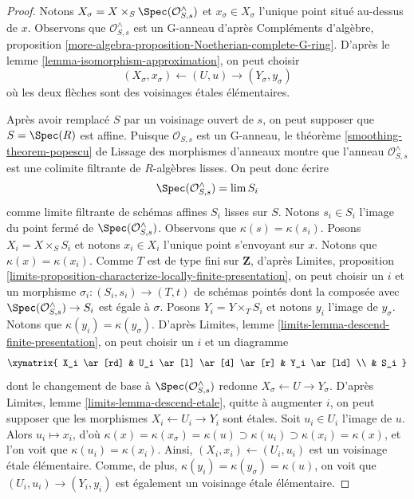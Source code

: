 \begin{proof}
Notons $X_\sigma = X \times_S \Spec(\mathcal{O}_{S, s}^\wedge)$
et $x_\sigma \in X_\sigma$ l'unique point situé au-dessus de $x$.
Observons que $\mathcal{O}_{S, s}^\wedge$ est un G-anneau d'après
Compléments d'algèbre, proposition
\ref{more-algebra-proposition-Noetherian-complete-G-ring}.
D'après le lemme \ref{lemma-isomorphism-approximation},
on peut choisir
$$
(X_\sigma, x_\sigma) \leftarrow (U, u) \rightarrow (Y_\sigma, y_\sigma)
$$
où les deux flèches sont des voisinages \'etales élémentaires.

\medskip\noindent
Après avoir remplacé $S$ par un voisinage ouvert de $s$, on peut
supposer que $S = \Spec(R)$ est affine. Puisque $\mathcal{O}_{S, s}$
est un G-anneau, le théorème \ref{smoothing-theorem-popescu} de Lissage des morphismes d'anneaux montre que
l'anneau $\mathcal{O}_{S, s}^\wedge$ est une colimite filtrante de
$R$-algèbres lisses. On peut donc écrire
$$
\Spec(\mathcal{O}_{S, s}^\wedge) = \lim S_i
$$
comme limite filtrante de schémas affines $S_i$ lisses sur $S$.
Notons $s_i \in S_i$ l'image du point fermé de
$\Spec(\mathcal{O}_{S, s}^\wedge)$. Observons que $\kappa(s) = \kappa(s_i)$.
Posons $X_i = X \times_S S_i$ et notons $x_i \in X_i$ l'unique
point s'envoyant sur $x$. Notons que $\kappa(x) = \kappa(x_i)$.
Comme $T$ est de type fini sur $\mathbf{Z}$, d'après Limites, proposition
\ref{limits-proposition-characterize-locally-finite-presentation},
on peut choisir un $i$ et un morphisme $\sigma_i : (S_i, s_i) \to (T, t)$
de schémas pointés dont la composée avec
$\Spec(\mathcal{O}_{S, s}^\wedge) \to S_i$ est égale à $\sigma$.
Posons $Y_i = Y \times_T S_i$ et notons $y_i$ l'image de
$y_\sigma$. Notons que $\kappa(y_i) = \kappa(y_\sigma)$.
D'après Limites, lemme \ref{limits-lemma-descend-finite-presentation},
on peut choisir un $i$ et un diagramme
$$
\xymatrix{
X_i \ar[rd] &
U_i \ar[l] \ar[d] \ar[r] &
Y_i \ar[ld] \\
& S_i
}
$$
dont le changement de base à $\Spec(\mathcal{O}_{S, s}^\wedge)$
redonne $X_\sigma \leftarrow U \rightarrow Y_\sigma$.
D'après Limites, lemme \ref{limits-lemma-descend-etale},
quitte à augmenter $i$, on peut supposer que les morphismes
$X_i \leftarrow U_i \rightarrow Y_i$ sont \'etales.
Soit $u_i \in U_i$ l'image de $u$. Alors $u_i \mapsto x_i$,
d'où
$\kappa(x) = \kappa(x_\sigma) = \kappa(u) \supset \kappa(u_i) \supset
\kappa(x_i) = \kappa(x)$, et l'on voit que $\kappa(u_i) = \kappa(x_i)$.
Ainsi, $(X_i, x_i) \leftarrow (U_i, u_i)$ est un voisinage
\'etale élémentaire. Comme, de plus, $\kappa(y_i) = \kappa(y_\sigma) = \kappa(u)$,
on voit que $(U_i, u_i) \to (Y_i, y_i)$ est également un voisinage
\'etale élémentaire.


\end{proof}
